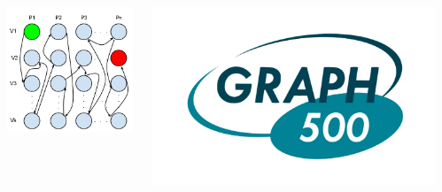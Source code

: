 \documentclass[final]{beamer}
\begin{document}
\begin{frame}[t]
\begin{columns}[t]
\begin{column}{0.60\paperwidth}
\begin{columns}[t,totalwidth=0.60\paperwidth]
\begin{column}{0.28\paperwidth}
\begin{columns}[t,totalwidth=0.28\paperwidth]
\begin{column}{0.12\paperwidth}
								\begin{center} \includegraphics[width=0.12\paperwidth]{img/linked_list/rand_node_seq_proc} \end{center}
							\end{column}
							\begin{column}{0.12\paperwidth}
								\begin{center} \includegraphics[width=0.12\paperwidth]{img/logo_graph500} \end{center}
							\end{column}
						\end{columns}
					\end{column}
					\begin{column}{0.28\paperwidth}

\end{column}
\end{columns}
\end{column}
\end{columns}
\end{frame}
\end{document}
